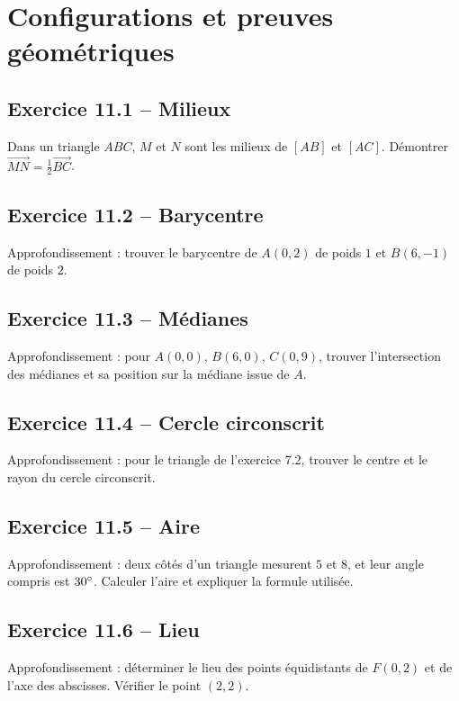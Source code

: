 \chapter{Configurations et preuves géométriques}
\section*{Exercice 11.1 -- Milieux}
Dans un triangle $ABC$, $M$ et $N$ sont les milieux de $[AB]$ et $[AC]$. Démontrer $\overrightarrow{MN}=\tfrac12\overrightarrow{BC}$.

\section*{Exercice 11.2 -- Barycentre}
Approfondissement : trouver le barycentre de $A(0,2)$ de poids $1$ et $B(6,-1)$ de poids $2$.

\section*{Exercice 11.3 -- Médianes}
Approfondissement : pour $A(0,0)$, $B(6,0)$, $C(0,9)$, trouver l'intersection des médianes et sa position sur la médiane issue de $A$.

\section*{Exercice 11.4 -- Cercle circonscrit}
Approfondissement : pour le triangle de l'exercice 7.2, trouver le centre et le rayon du cercle circonscrit.

\section*{Exercice 11.5 -- Aire}
Approfondissement : deux côtés d'un triangle mesurent $5$ et $8$, et leur angle compris est $30^{\circ}$. Calculer l'aire et expliquer la formule utilisée.

\section*{Exercice 11.6 -- Lieu}
Approfondissement : déterminer le lieu des points équidistants de $F(0,2)$ et de l'axe des abscisses. Vérifier le point $(2,2)$.
